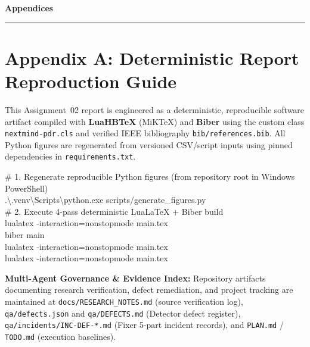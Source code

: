 \FloatBarrier
\vspace{12pt}
\appendix

{\headingfont\Large\bfseries\color{fgEspresso} Appendices}\par
\vspace{-2pt}\noindent\textcolor{fgAmber}{\rule{\linewidth}{1.1pt}}
\vspace{4pt}

\section*{Appendix A: Deterministic Report Reproduction Guide}

This Assignment~02 report is engineered as a deterministic, reproducible software artifact compiled with \textbf{LuaHBTeX} (MiKTeX) and \textbf{Biber} using the custom class \texttt{nextmind-pdr.cls} and verified IEEE bibliography \texttt{bib/references.bib}. All Python figures are regenerated from versioned CSV/script inputs using pinned dependencies in \texttt{requirements.txt}.

\noindent
\begin{tcolorbox}[
  enhanced,
  breakable=false,
  colback=fgSoftCream,
  colframe=fgRuleGray,
  borderline west={3.5pt}{0pt}{fgTeal},
  boxrule=0.5pt,
  arc=2pt,
  left=8pt, right=8pt, top=5pt, bottom=5pt
]
{\footnotesize\ttfamily
\# 1. Regenerate reproducible Python figures (from repository root in Windows PowerShell)\\
.\textbackslash.venv\textbackslash Scripts\textbackslash python.exe scripts/generate\_figures.py\\[3pt]
\# 2. Execute 4-pass deterministic LuaLaTeX + Biber build\\
lualatex -interaction=nonstopmode main.tex\\
biber main\\
lualatex -interaction=nonstopmode main.tex\\
lualatex -interaction=nonstopmode main.tex
}
\end{tcolorbox}

\textbf{Multi-Agent Governance \& Evidence Index:} Repository artifacts documenting research verification, defect remediation, and project tracking are maintained at \texttt{docs/RESEARCH\_NOTES.md} (source verification log), \texttt{qa/defects.json} and \texttt{qa/DEFECTS.md} (Detector defect register), \texttt{qa/incidents/INC-DEF-*.md} (Fixer 5-part incident records), and \texttt{PLAN.md} / \texttt{TODO.md} (execution baselines).

